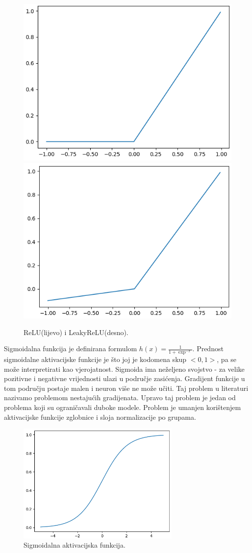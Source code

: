 \documentclass[times, utf8, diplomski,  numeric]{fer}
\begin{document}
\begin{figure}[htp]

\centering
\includegraphics[width=.5\textwidth]{./images/relu}\hfill
\includegraphics[width=.5\textwidth]{./images/lrelu}

\caption{ReLU(lijevo) i LeakyReLU(desno).}
\label{fig:relu}
\end{figure}
\par
Sigmoidalna funkcija je definirana formulom $h(x)=\frac{1}{1+\exp^{-x}}$. Prednost sigmoidalne aktivacijske funkcije je što joj je kodomena skup $<0,1>$, pa se može interpretirati kao vjerojatnost. Sigmoida ima neželjeno svojstvo - za velike pozitivne i negativne vrijednosti ulazi u područje zasićenja. Gradijent funkcije u tom području postaje malen i neuron više ne može učiti. Taj problem u literaturi nazivamo problemom nestajućih gradijenata. Upravo taj problem je jedan od problema koji su ograničavali duboke modele. Problem je umanjen korištenjem aktivacijske funkcije zglobnice i sloja normalizacije po grupama.
\begin{figure}[htp]

\centering
\includegraphics[width=8cm]{./images/sigmoid}\hfill

\caption{Sigmoidalna aktivacijska funkcija.}
\label{fig:sigmoid}
\end{figure}
\end{document}
